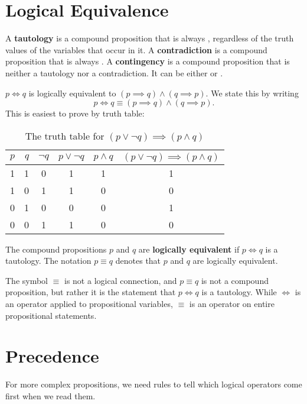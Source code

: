 \section{Logical Equivalence}
  A \textbf{tautology} is a compound proposition that is always \ltrue{}, regardless of the truth values of the variables that occur in it.
  A \textbf{contradiction} is a compound proposition that is always \lfalse{}.
  A \textbf{contingency} is a compound proposition that is neither a tautology nor a contradiction.
  It can be either \ltrue{} or \lfalse{}.
\begin{ex}
    \( p \iff q \) is logically equivalent to \( (p \implies q) \wedge (q \implies p)\).
    We state this by writing
    \[ p \iff q \equiv (p \implies q) \wedge (q \implies p).\]
    This is easiest to prove by truth table:
\begin{table}[H]
  \centering
    \begin{tabular}{lrcccc}
      \toprule
      $p$ & $q$ & $\neg q$ & $p \lor \neg q$ & $p \land q$ & $(p \lor \neg q) \implies (p \land q)$ \\ \midrule
      1 & 1 & 0      & 1             & 1         & 1 \\
      1 & 0 & 1      & 1             & 0         & 0 \\
      0 & 1 & 0      & 0             & 0         & 1 \\
      0 & 0 & 1      & 1             & 0         & 0 \\
      \bottomrule
    \end{tabular}
  \caption{The truth table for $(p \lor \neg q) \implies (p \land q)$}
\end{table}
\end{ex}
The compound propositions \(p\) and \(q\) are \textbf{logically equivalent} if \(p \iff q\) is a tautology.
The notation \(p \equiv q\) denotes that \(p\) and \(q\) are logically equivalent.
\begin{remark}
  The symbol \(\equiv\) is not a logical connection, and \(p\equiv q\) is not a compound proposition, but rather it is the statement that \(p \iff q\) is a tautology. While $\iff$ is an operator applied to propositional variables, $\equiv$ is an operator on entire propositional statements.
\end{remark}

\section{Precedence}
For more complex propositions, we need rules to tell which logical operators come first when we read them.

